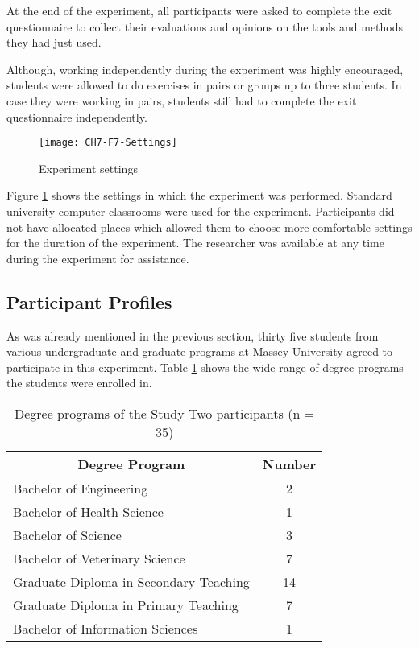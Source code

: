 At the end of the experiment, all participants were asked to complete the exit
questionnaire to collect their evaluations and opinions on the tools and methods
they had just used.

Although, working independently during the experiment was highly encouraged,
students were allowed to do exercises in pairs or groups up to three students.
In case they were working in pairs, students still had to complete the exit
questionnaire independently.

\begin{figure}[htb]
\centering
\texttt{[image: CH7-F7-Settings]}
\caption{Experiment settings}
\label{fig:settings}
\end{figure}

Figure \ref{fig:settings} shows the settings in which the experiment was
performed. Standard university computer classrooms were used for the experiment.
Participants did not have allocated places which allowed them to choose more
comfortable settings for the duration of the experiment. The researcher was
available at any time during the experiment for assistance.

\subsection{Participant Profiles}

As was already mentioned in the previous section, thirty five students from
various undergraduate and graduate programs at Massey University agreed to
participate in this experiment. Table \ref{tab:degree} shows the wide range of
degree programs the students were enrolled in.

\begin{table}[htb] \small
\setlength{\abovecaptionskip}{0pt}
  \caption{Degree programs of the Study Two participants (n = 35)}
  \begin{center}
    \begin{tabular}{| l | c |}
    \hline
     \multicolumn{1}{|c|}{\textbf{Degree Program}} &
     \multicolumn{1}{c|}{\textbf{Number}} \\
     \hline
     Bachelor of Engineering & 2 \\ \hline
     Bachelor of Health Science & 1 \\ \hline
     Bachelor of Science & 3 \\ \hline
     Bachelor of Veterinary Science & 7 \\ \hline
     Graduate Diploma in Secondary Teaching & 14 \\ \hline
     Graduate Diploma in Primary Teaching & 7 \\ \hline
     Bachelor of Information Sciences & 1 \\ \hline
    \end{tabular}
  \end{center}
  \label{tab:degree}
\end{table}

